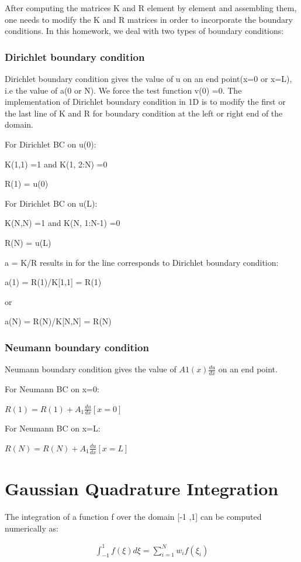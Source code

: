 \documentclass[paper=a4, fontsize=11pt]{article} %
\begin{document}
After computing the matrices K and R element by element and assembling them, one needs to modify the K and R matrices in order to incorporate the boundary conditions. In this homework, we deal with two types of boundary conditions: 

\subsubsection{Dirichlet boundary condition}
Dirichlet boundary condition gives the value of u on an end point(x=0 or x=L), i.e the value of a(0 or N). We force the test function v(0) =0. The implementation of Dirichlet boundary condition in 1D is to modify the first or the last line of K and R for boundary condition at the left or right end of the domain.

For Dirichlet BC on u(0):

K(1,1) =1 and K(1, 2:N) =0 

R(1) = u(0)

For Dirichlet BC on u(L):

K(N,N) =1 and K(N, 1:N-1) =0 

R(N) = u(L)

a = K/R results in for the line corresponds to Dirichlet boundary condition: 

a(1) = R(1)/K[1,1] = R(1)

or
 
a(N) = R(N)/K[N,N] = R(N) 
\subsubsection{Neumann boundary condition}
Neumann boundary condition gives the value of $A1(x)\frac{du}{dx}$ on an end point.

For Neumann BC on x=0:

$R(1) = R(1) + A_1 \frac{du}{dx}[x=0] $


For Neumann BC on x=L:

$R(N)=R(N)+ A_1 \frac{du}{dx}[x=L] $

\section{Gaussian Quadrature Integration}

The integration of a function f over the domain [-1 ,1] can be computed numerically as:

\begin{eqnarray}
\int_{-1}^1 f(\xi) d\xi = \sum_{i=1}^N w_i f(\xi _i)
\end{eqnarray}
\end{document}
